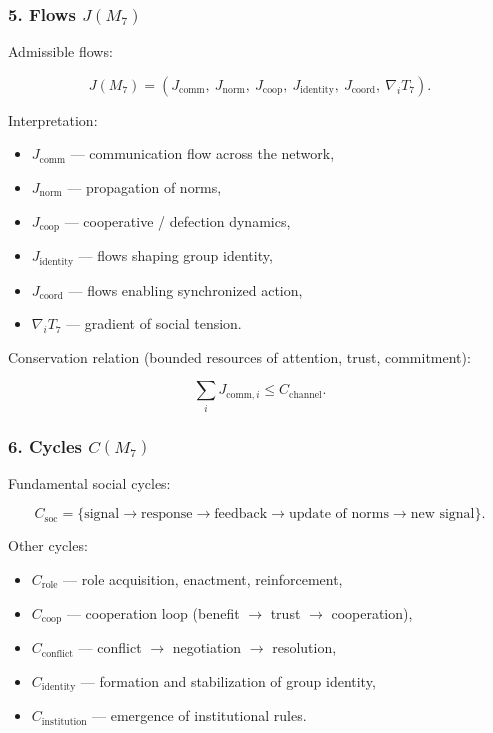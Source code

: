 \subsubsection*{5. Flows \texorpdfstring{$J(M_7)$}{J(M_7)}}

Admissible flows:

\[
J(M_7)=
\left(
J_{\mathrm{comm}},\
J_{\mathrm{norm}},\
J_{\mathrm{coop}},\
J_{\mathrm{identity}},\
J_{\mathrm{coord}},\
\nabla_i T_7
\right).
\]

Interpretation:

\begin{itemize}
    \item $J_{\mathrm{comm}}$ — communication flow across the network,
    \item $J_{\mathrm{norm}}$ — propagation of norms,
    \item $J_{\mathrm{coop}}$ — cooperative / defection dynamics,
    \item $J_{\mathrm{identity}}$ — flows shaping group identity,
    \item $J_{\mathrm{coord}}$ — flows enabling synchronized action,
    \item $\nabla_i T_7$ — gradient of social tension.
\end{itemize}

Conservation relation (bounded resources of attention, trust, commitment):

\[
\sum_i J_{\mathrm{comm},i} \le C_{\mathrm{channel}}.
\]

\subsubsection*{6. Cycles \texorpdfstring{$C(M_7)$}{C(M_7)}}

Fundamental social cycles:

\[
C_{\mathrm{soc}} =
\{
\text{signal} \to \text{response} \to \text{feedback} \to
\text{update of norms} \to \text{new signal}
\}.
\]

Other cycles:

\begin{itemize}
    \item $C_{\mathrm{role}}$ — role acquisition, enactment, reinforcement,
    \item $C_{\mathrm{coop}}$ — cooperation loop (benefit $\to$ trust $\to$ cooperation),
    \item $C_{\mathrm{conflict}}$ — conflict $\to$ negotiation $\to$ resolution,
    \item $C_{\mathrm{identity}}$ — formation and stabilization of group identity,
    \item $C_{\mathrm{institution}}$ — emergence of institutional rules.
\end{itemize}

